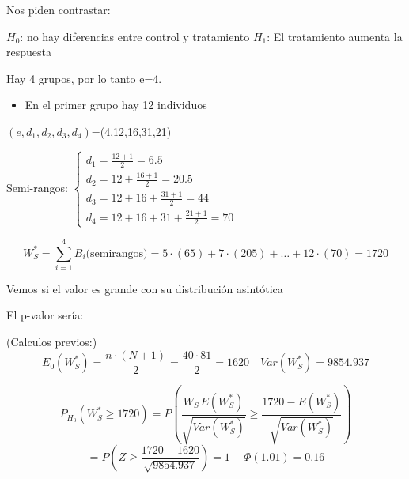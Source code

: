 Nos piden contrastar:

\begin{center}
    $H_0$: no hay diferencias entre control y tratamiento
    $H_1$: El tratamiento aumenta la respuesta
\end{center}

Hay 4 grupos, por lo tanto e=4.

\begin{itemize}
    \item En el primer grupo hay 12 individuos
\end{itemize}

$(e,d_1,d_2,d_3,d_4)$=(4,12,16,31,21)

Semi-rangos:
\(
\left\{
\begin{matrix}
    d_1=\frac{12+1}{2}=6.5 \\
    d_2=12+\frac{16+1}{2}=20.5 \\
    d_3=12+16+\frac{31+1}{2}=44 \\
    d_4=12+16+31+\frac{21+1}{2}=70
\end{matrix}
\right.
\)

\[
W_S^*=\sum_{i=1}^{4} B_i \text{(semirangos)}=5\cdot (65)+ 7\cdot (205)+ \dots+12 \cdot (70)=1720
\]

Vemos si el valor es grande con su distribución asintótica

El p-valor sería:

(Calculos previos:)
\[
E_0(W_S^*)=\frac{n \cdot (N+1)}{2}= \frac{40 \cdot 81}{2}=1620 \quad Var(W_S^*)=9854.937
\]

\[
P_{H_0}(W_S^* \geq 1720)=P \left( \frac{W_S^-E(W_S^*)}{\sqrt{Var(W_S^*)}}\geq \frac{1720-E(W_S^*)}{\sqrt{Var(W_S^*)}}\right)
\]
\[
=P \left(Z \geq \frac{1720-1620}{\sqrt{9854.937}}\right)=1-\Phi(1.01)=0.16
\]
